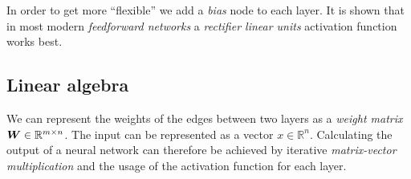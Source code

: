 
In order to get more \enquote{flexible} we add a \emph{bias} node to each layer.
It is shown that in most modern \emph{feedforward networks} a \emph{rectifier linear units} activation function works best. \cite{Nair-Hinton} \cite{inproceedings}



\subsection{Linear algebra}
We can represent the weights of the edges between two layers as a \emph{weight matrix} \(\boldsymbol{W} \in \mathbb{R}^{m \times n}\).
The input can be represented as a vector \({x \in \mathbb{R}^n}\).
Calculating the output of a neural network can therefore be achieved by iterative \emph{matrix-vector multiplication} and the usage of the activation function for each layer.